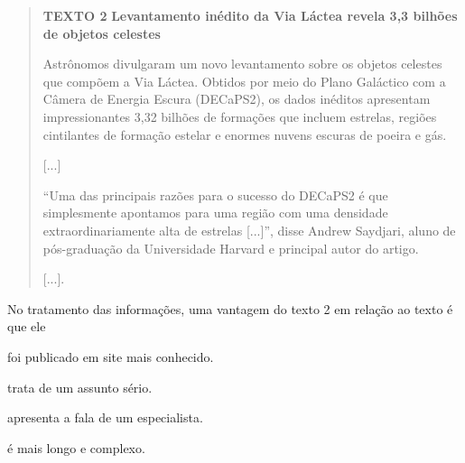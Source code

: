 \begin{quote}
\textbf{TEXTO 2}
\textbf{Levantamento inédito da Via Láctea revela 3,3 bilhões
de objetos celestes}

Astrônomos divulgaram um novo levantamento sobre os objetos celestes
que compõem a Via Láctea. Obtidos por meio do Plano Galáctico com a
Câmera de Energia Escura (DECaPS2), os dados inéditos apresentam
impressionantes 3,32 bilhões de formações que incluem estrelas, regiões
cintilantes de formação estelar e enormes nuvens escuras de poeira e
gás.

{[}...{]}

“Uma das principais razões para o sucesso do DECaPS2 é que simplesmente
apontamos para uma região com uma densidade extraordinariamente alta de
estrelas {[}...{]}”, disse Andrew Saydjari, aluno de pós-graduação da
Universidade Harvard e principal autor do artigo.

{[}...{]}.

\end{quote}

No tratamento das informações, uma vantagem do texto 2 em relação ao texto é que ele

\begin{escolha}
\item foi publicado em site mais conhecido.

\item trata de um assunto sério.

\item apresenta a fala de um especialista.

\item é mais longo e complexo.
\end{escolha}



